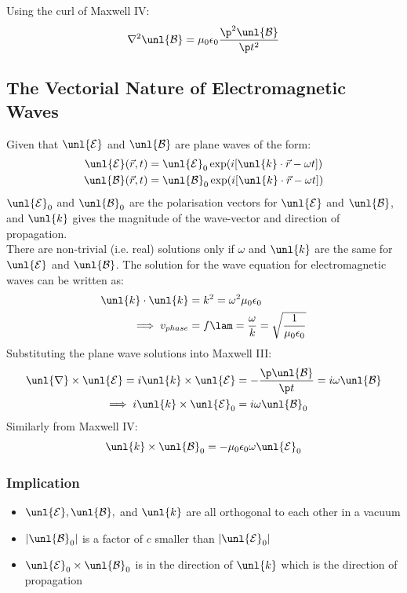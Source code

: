 \documentclass[a4paper, 11pt, normalem]{report}
\renewcommand\E{\mathcal{E}}
\newcommand\uE{\unl{\E}}
\renewcommand\B{\mathcal{B}}
\newcommand\uB{\unl{\B}}
\renewcommand\del{\unl{\nabla}}
\newcommand\eno{\epsilon_0}
\newcommand\vk{\unl{k}}
\begin{document}
\chapter{}
Using the curl of Maxwell \RN{4}:
\begin{equation}
    \nabla^2\uB = \mu_0\eno\frac{\p^2\uB}{\p t^2}
\end{equation}

\section{The Vectorial Nature of Electromagnetic Waves}
Given that $\uE$ and $\uB$ are plane waves of the form:
\begin{align}
    \uE(\vec{r},t) &= \uE_0\exp(i[\vk\cdot\vec{r}-\omega t]) \\
    \uB(\vec{r},t) &= \uB_0\exp(i[\vk\cdot\vec{r}-\omega t])
\end{align}
$\uE_0$ and $\uB_0$ are the polarisation vectors for $\uE$ and $\uB$, and $\vk$ gives the magnitude of the wave-vector and direction of propagation. \\
There are non-trivial (i.e. real) solutions only if $\omega$ and $\vk$ are the same for $\uE$ and $\uB$.
The solution for the wave equation for electromagnetic waves can be written as:
\begin{align}
    \vk\cdot\vk &= k^2 = \omega^2\mu_0\eno \\
    \implies v_{phase} &= f\lam = \frac{\omega}{k} = \sqrt{\frac{1}{\mu_0\eno}}
\end{align}
Substituting the plane wave solutions into Maxwell \RN{3}:
\begin{align}
    \del \times \uE = i\vk \times \uE &= -\frac{\p\uB}{\p t} = i\omega\uB \\
    \implies i\vk\times\uE_0 &= i\omega\uB_0
\end{align}
Similarly from Maxwell \RN{4}:
\begin{equation}
    \vk \times \uB_0 = -\mu_0\eno\omega\uE_0
\end{equation}

\subsection{Implication}
\begin{itemize}
    \item $\uE, \uB,$ and $\vk$ are all orthogonal to each other in a vacuum
    \item $|\uB_0|$ is a factor of $c$ smaller than $|\uE_0|$
    \item $\uE_0\times\uB_0$ is in the direction of $\vk$ which is the direction of propagation
\end{itemize}
\end{document}
